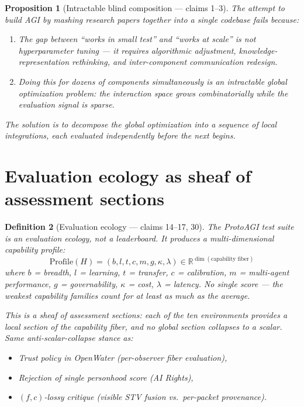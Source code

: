 \documentclass[11pt,a4paper]{article}
\newtheorem{definition}{Definition}[section]
\newtheorem{proposition}[definition]{Proposition}
\begin{document}
\begin{proposition}[Intractable blind composition --- claims 1--3]
\label{prop:gap}
The attempt to build AGI by mashing research papers together into a
single codebase fails because:
\begin{enumerate}
\item The gap between ``works in small test'' and ``works at scale''
  is not hyperparameter tuning --- it requires algorithmic adjustment,
  knowledge-representation rethinking, and inter-component communication
  redesign.
\item Doing this for dozens of components simultaneously is an
  intractable global optimization problem: the interaction space
  grows combinatorially while the evaluation signal is sparse.
\end{enumerate}
The solution is to decompose the global optimization into a sequence
of local integrations, each evaluated independently before the next
begins.
\end{proposition}


\section{Evaluation ecology as sheaf of assessment sections}
\label{sec:eval}

\begin{definition}[Evaluation ecology --- claims 14--17, 30]
\label{def:eval}
The ProtoAGI test suite is an evaluation ecology, not a leaderboard.
It produces a multi-dimensional capability profile:
\[
  \text{Profile}(H) = (b, l, t, c, m, g, \kappa, \lambda) \in
  \mathbb{R}^{\dim(\text{capability fiber})}
\]
where $b$ = breadth, $l$ = learning, $t$ = transfer, $c$ = calibration,
$m$ = multi-agent performance, $g$ = governability, $\kappa$ = cost,
$\lambda$ = latency. No single score --- the weakest capability families
count for at least as much as the average.

This is a sheaf of assessment sections: each of the ten environments
provides a local section of the capability fiber, and no global section
collapses to a scalar. Same anti-scalar-collapse stance as:
\begin{itemize}
\item Trust policy in OpenWater (per-observer fiber evaluation),
\item Rejection of single personhood score (AI Rights),
\item $(f,c)$-lossy critique (visible STV fusion vs.\ per-packet provenance).
\end{itemize}
\end{definition}
\end{document}
